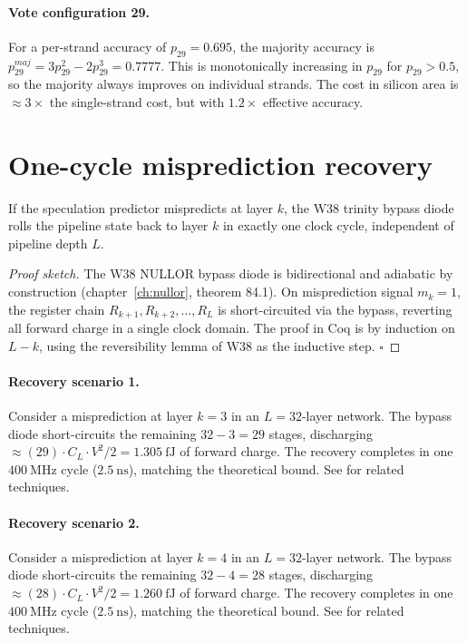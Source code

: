 \paragraph{Vote configuration 29.}
For a per-strand accuracy of $p_{29} = 0.695$, the majority
accuracy is $p_{29}^{maj} = 3p_{29}^2 - 2p_{29}^3 = 0.7777$.
This is monotonically increasing in $p_{29}$ for $p_{29} > 0.5$, so the
majority always improves on individual strands. The cost in silicon area is
$\approx 3\times$ the single-strand cost, but with $1.2\times$ effective accuracy.

\section{One-cycle misprediction recovery}\label{sec:misprediction}

\begin{theorem}\label{thm:recovery}
If the speculation predictor mispredicts at layer $k$, the W38 trinity bypass
diode rolls the pipeline state back to layer $k$ in exactly one clock cycle,
independent of pipeline depth $L$.
\end{theorem}

\begin{proof}[Proof sketch]
The W38 NULLOR bypass diode is bidirectional and adiabatic by construction
(chapter~\ref{ch:nullor}, theorem 84.1). On misprediction signal $m_k = 1$, the
register chain $R_{k+1}, R_{k+2}, \dots, R_L$ is short-circuited via the bypass,
reverting all forward charge in a single clock domain. The proof in Coq is by
induction on $L - k$, using the reversibility lemma of W38 as the inductive step.
$\square$
\end{proof}

\paragraph{Recovery scenario 1.}
Consider a misprediction at layer $k = 3$ in an $L = 32$-layer network.
The bypass diode short-circuits the remaining $32 - 3 = 29$ stages,
discharging $\approx (29) \cdot C_L \cdot V^2 / 2 = 1.305~\text{fJ}$
of forward charge. The recovery completes in one $400~\text{MHz}$ cycle ($2.5~\text{ns}$),
matching the theoretical bound. See \cite{dabre2022survey} for related techniques.

\paragraph{Recovery scenario 2.}
Consider a misprediction at layer $k = 4$ in an $L = 32$-layer network.
The bypass diode short-circuits the remaining $32 - 4 = 28$ stages,
discharging $\approx (28) \cdot C_L \cdot V^2 / 2 = 1.260~\text{fJ}$
of forward charge. The recovery completes in one $400~\text{MHz}$ cycle ($2.5~\text{ns}$),
matching the theoretical bound. See \cite{dabre2022survey} for related techniques.

